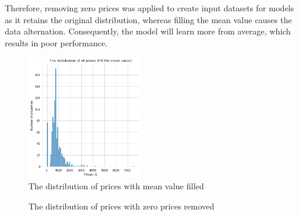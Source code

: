 \documentclass[12pt,twoside]{report}
\begin{document}
Therefore, removing zero prices was applied to create input datasets for models as it retains the original distribution, whereas filling the mean value causes the data alternation. Consequently, the model will learn more from average, which results in poor performance. 

\begin{figure}[h]
	\centering
	\includegraphics[width=5cm]{price_all_mean}
	\caption{The distribution of prices with mean value filled}
	\label{price_filled}
\end{figure}

\begin{figure}[h]
	\centering
	\caption{The distribution of prices with zero prices removed}
	\label{price_removed}
\end{figure}
\end{document}

